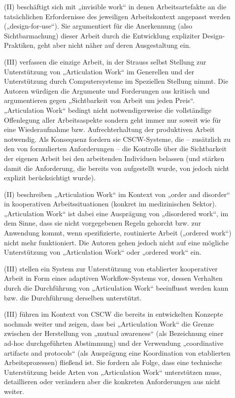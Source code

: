 \begin{description}
	\item[\citet{Suchman99}] (II) beschäftigt sich mit „invisible work“ in denen Arbeitsartefakte an die tatsächlichen Erfordernisse des jeweiligen Arbeitskontext angepasst werden („design-for-use“). Sie argumentiert für die Anerkennung (also Sichtbarmachung) dieser Arbeit durch die Entwicklung expliziter Design-Praktiken, geht aber nicht näher auf deren Ausgestaltung ein.
	\item[\citet{Star99}] (III) verfassen die einzige Arbeit, in der Strauss selbst Stellung zur Unterstützung von „Articulation Work“ im Generellen und der Unterstützung durch Computersysteme im Speziellen Stellung nimmt. Die Autoren  würdigen die Argumente und Forderungen aus \citep{Schmidt96} kritisch und argumentieren gegen „Sichtbarkeit von Arbeit um jeden Preis“. „Articulation Work“ bedingt nicht notwendigerweise die vollständige Offenlegung aller Arbeitsaspekte sondern geht immer nur soweit wie für eine Wiederaufnahme bzw. Aufrechterhaltung der produktiven Arbeit notwendig. Als Konsequenz fordern sie \gls{CSCW}-Systeme, die -- zusätzlich zu den von \citet{Schmidt96} formulierten Anforderungen -- die Kontrolle über die Sichtbarkeit der eigenen Arbeit bei den arbeitenden Individuen belassen (und stärken damit die Anforderung, die bereits von \citet{Schmidt92} aufgestellt wurde, von \citet{Schmidt96} jedoch nicht explizit berücksichtigt wurde).
	\item[\citet{Berg00}] (II) beschreiben „Articulation Work“ im Kontext von „order and disorder“ in kooperativen Arbeitssituationen (konkret im medizinischen Sektor). „Articulation Work“ ist dabei eine Ausprägung von „disordered work“, im dem Sinne, dass sie nicht vorgegebenen Regeln gehorcht bzw. zur Anwendung kommt, wenn spezifizierte, routinierte Arbeit („ordered work“) nicht mehr funktioniert. Die Autoren gehen jedoch nicht auf eine mögliche Unterstützung von „Articulation Work“ oder „ordered work“ ein.
	\item[\citet{Divitini00}] (III) stellen ein System zur Unterstützung von etablierter kooperativer Arbeit in Form eines adaptiven Workflow-Systems vor, dessen Verhalten durch die Durchführung von „Articulation Work“ beeinflusst werden kann bzw. die Durchführung derselben unterstützt.
	\item[\citet{Schmidt00}] (III) führen im Kontext von CSCW die bereits in \citep{Schmidt96} entwickelten Konzepte nochmals weiter und zeigen, dass bei „Articulation Work“ die Grenze zwischen der Herstellung von „mutual awareness“ (als Bezeichnung einer ad-hoc durchgeführten Abstimmung) und der Verwendung „coordinative artifacts and protocols“ (als Ausprägung eine Koordination von etablierten Arbeitsprozessen) fließend ist. Sie fordern als Folge, dass eine technische Unterstützung beide Arten von „Articulation Work“ unterstützen muss, detaillieren oder verändern aber die konkreten Anforderungen aus \citep{Schmidt96} nicht weiter.

\end{description}

